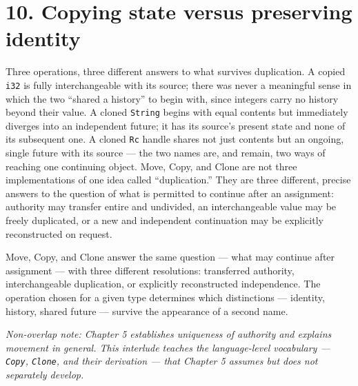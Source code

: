 \documentclass[11pt]{book}
\begin{document}
\section*{10. Copying state versus preserving identity}

Three operations, three different answers to what survives duplication. A copied \texttt{i32} is fully interchangeable with its source; there was never a meaningful sense in which the two ``shared a history'' to begin with, since integers carry no history beyond their value. A cloned \texttt{String} begins with equal contents but immediately diverges into an independent future; it has its source's present state and none of its subsequent one. A cloned \texttt{Rc} handle shares not just contents but an ongoing, single future with its source --- the two names are, and remain, two ways of reaching one continuing object. Move, Copy, and Clone are not three implementations of one idea called ``duplication.'' They are three different, precise answers to the question of what is permitted to continue after an assignment: authority may transfer entire and undivided, an interchangeable value may be freely duplicated, or a new and independent continuation may be explicitly reconstructed on request.

\begin{invariantbox}
Move, Copy, and Clone answer the same question --- what may continue after assignment --- with three different resolutions: transferred authority, interchangeable duplication, or explicitly reconstructed independence. The operation chosen for a given type determines which distinctions --- identity, history, shared future --- survive the appearance of a second name.
\end{invariantbox}

\bigskip
\noindent\textit{Non-overlap note: Chapter 5 establishes uniqueness of authority and explains movement in general. This interlude teaches the language-level vocabulary --- \texttt{Copy}, \texttt{Clone}, and their derivation --- that Chapter 5 assumes but does not separately develop.}
\end{document}

